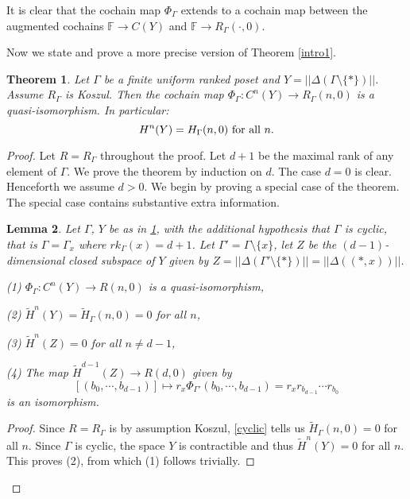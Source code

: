 \documentclass[11pt,righttag]{amsart}
\newtheorem{thm}{Theorem}[section]
\newtheorem{lemma}[thm]{Lemma}
\theoremstyle{definition}
\begin{document}
It is clear that the cochain map $\Phi_\Gamma$ extends to a cochain map between the augmented cochains 
${{\mathbb F}} \to C(Y)$ and ${{\mathbb F}}\to R_\Gamma(\cdot,0)$.

Now we state and prove a more precise version of Theorem \ref{intro1}.

\begin{thm}\label{main1}  Let $\Gamma$ be a finite uniform ranked poset  and $Y=||\Delta(\Gamma\setminus\{*\})||$.  
Assume $R_\Gamma$ is Koszul.   Then the cochain map $\Phi_\Gamma:C^n(Y) \to R_\Gamma(n,0)$ is a quasi-isomorphism.  In particular:
$$ H^n(Y) = H_\Gamma(n,0) \hbox{ for all } n.$$

\end{thm}

\begin{proof}  Let $R=R_\Gamma$ throughout the proof.  Let $d+1$ be the maximal rank of any element of $\Gamma$.  We prove the theorem by induction on $d$.  The case $d=0$ is clear.  Henceforth we assume $d>0$.  We begin by proving a special case of the theorem.  The special case contains substantive extra information.

\begin{lemma}\label{magic}   Let $\Gamma$, $Y$ be as in \ref{main1}, with the additional hypothesis that $\Gamma$ is cyclic, that is
$\Gamma = \Gamma_x$ where $rk_\Gamma(x) = d+1$.   Let $\Gamma' = \Gamma\setminus\{x\}$, let $Z$ be the $(d-1)$-dimensional closed subspace of $Y$ given by $Z = ||\Delta(\Gamma'\setminus\{*\})|| = ||\Delta((*,x))||$.  

{\rm (1)}  $\Phi_\Gamma:C^n(Y) \to R(n,0)$ is a quasi-isomorphism,

{\rm (2)} $\tilde H^n(Y) = \tilde H_\Gamma(n,0) = 0$ for all $n$,

{\rm (3)}  $\tilde H^n(Z) = 0$ for  all $n\ne d-1$,

{\rm (4)} The map $\tilde H^{d-1}(Z) \to R(d,0)$ given by 
$$[(b_0,\cdots,b_{d-1})] \mapsto r_x\Phi_{\Gamma'}(b_0,\cdots,b_{d-1}) = r_xr_{b_{d-1}}\cdots r_{b_0}$$
is an isomorphism. 

\end{lemma}

\begin{proof}
Since $R=R_\Gamma$ is by assumption Koszul, \ref{cyclic} tells us $ \tilde H_\Gamma(n,0) = 0$ for all $n$.  Since $\Gamma$ is cyclic, the space $Y$ is contractible and thus
$\tilde H^n(Y) = 0$ for all $n$.  This proves (2), from which (1) follows trivially. 


\end{proof}
\end{proof}
\end{document}
